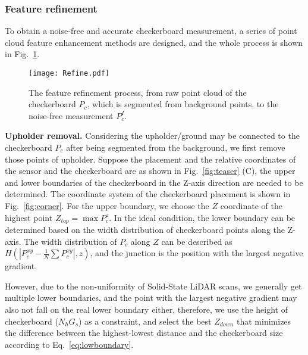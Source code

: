 \documentclass[journal]{vgtc}
\begin{document}
\subsubsection{Feature refinement}
To obtain a noise-free and accurate checkerboard measurement, a series of point cloud feature enhancement methods are designed, and the whole process is shown in Fig.~\ref{fig:refine}.


\begin{figure}[!htb]
	\centering
	\texttt{[image: Refine.pdf]} 
	\caption{The feature refinement process, from raw point cloud of the checkerboard $P_c$, which is segmented from background points, to the noise-free measurement $P^I_c$.}
	\label{fig:refine} 
\end{figure}


\textbf{Upholder removal.} Considering the upholder/ground may be connected to the checkerboard $P_c$ after being segmented from the background, we first remove those points of upholder. Suppose the placement and the relative coordinates of the sensor and the checkerboard are as shown in Fig.~\ref{fig:teaser} (C), the upper and lower boundaries of the checkerboard in the Z-axis direction are needed to be determined. The coordinate system of the checkerboard placement is shown in Fig.~\ref{fig:corner}.  For the upper boundary, we choose the $Z$ coordinate of the highest point $Z_{top} = \max{P^z_c}$. In the ideal condition, the lower boundary can be determined based on the width distribution of checkerboard points along the Z-axis. The width distribution of $P_c$ along $Z$ can be described as $H(| P^{xy}_c - \frac{1}{N} \sum P^{xy}_c |, z)$, and the junction is the position with the largest negative gradient. 

However, due to the non-uniformity of Solid-State LiDAR scans, we generally get multiple lower boundaries, and the point with the largest negative gradient may also not fall on the real lower boundary either, therefore, we use the height of checkerboard ($N_h G_s$) as a constraint, and select the best $Z_{down}$ that minimizes the difference between the highest-lowest distance and the checkerboard size according to Eq.~\ref{eq:lowboundary}. 

\end{document}

